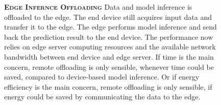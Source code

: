\begin{figure}
	\begin{minipage}{0.3\linewidth}
		\centering
		\begin{figure}
			\centering
			\captionsetup[subfigure]{justification=centering}
		\end{figure}
	\end{minipage}
	\hfill
	\begin{minipage}{0.65\linewidth}
		\textbf{\protect{} \textsc{Edge Infernce Offloading}}
		\color{caption-color} \newline
		Data and model inference is offloaded to the edge. The end device still acquires input data and transfer it to the edge. The edge performs model inference and send back the prediction result to the end device. The performance now relies on edge server computing resources and the available network bandwidth between end device and edge server. If time is the main concern, remote offloading is only sensible, whenever time could be saved, compared to device-based model inference. Or if energy efficiency is the main concern, remote offloading is only sensible, if energy could be saved by communicating the data to the edge.
	\end{minipage}
\end{figure}

